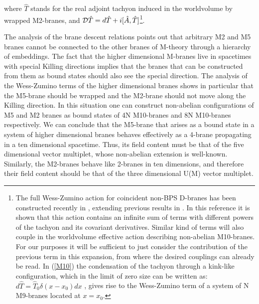 \documentclass[12pt,a4paper]{article}
\begin{document}
\noindent where ${\hat T}$ stands for
the real adjoint tachyon induced in the worldvolume by wrapped
M2-branes,
and ${\cal D}{\hat T}=d{\hat T}+i[{\hat A},{\hat T}]$\footnote{The 
full Wess-Zumino action for coincident 
non-BPS D-branes has been constructed recently in \cite{JM}, 
extending previous results in \cite{Kluson,BCR}. In this reference
it is shown
that this action contains an infinite sum
of terms with different powers of the tachyon and its covariant 
derivatives. Similar kind of terms will also couple in the
worldvolume effective action describing non-abelian M10-branes.
For our purposes it will be sufficient to just consider the
contribution of the previous term in this expansion, from where the
desired couplings can already be read. In (\ref{M10})
the condensation of the tachyon through a kink-like configuration,
which in the limit of zero size can be written as:
$d{\hat T}={\hat T}_0 \delta (x-x_0) dx$ \cite{BCR},
gives rise to the Wess-Zumino term of a system of N M9-branes
located at $x=x_0$.}.


The analysis of the brane descent relations points out 
that arbitrary M2 and M5 branes cannot be connected to the other
branes of M-theory through a hierarchy of embeddings. The fact that
the higher dimensional M-branes live in spacetimes
with special Killing directions implies that
the branes that can be constructed from them as bound states
should also see the special direction. 
The analysis of the Wess-Zumino
terms of the higher dimensional branes shows in particular that the
M5-brane should be wrapped 
and the M2-brane should not move along the Killing direction.
In this situation
one can construct non-abelian configurations
of M5 and M2 branes as bound states of 4N M10-branes and 8N M10-branes
respectively.
We can conclude that the M5-brane 
that arises as a bound state in a system of
higher dimensional branes behaves
effectively as a 4-brane propagating in a ten dimensional spacetime. 
Thus, its field content must
be that of the five dimensional vector multiplet, whose non-abelian
extension is well-known. Similarly, the M2-branes behave like 
2-branes in ten dimensions, and therefore their field content should
be that of the three dimensional U(M) vector multiplet.
\end{document}
